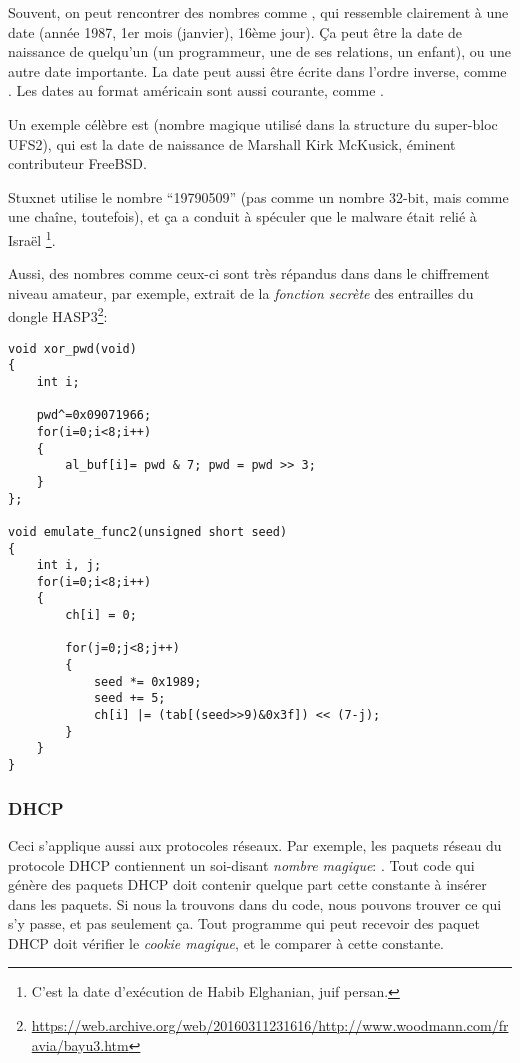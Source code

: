 
Souvent, on peut rencontrer des nombres comme , qui ressemble clairement
à une date (année 1987, 1er mois (janvier), 16ème jour).
Ça peut être la date de naissance de quelqu'un (un programmeur, une de ses relations,
un enfant), ou une autre date importante.
La date peut aussi être écrite dans l'ordre inverse, comme .
Les dates au format américain sont aussi courante, comme .

Un exemple célèbre est  (nombre magique utilisé dans la structure
du super-bloc UFS2), qui est la date de naissance de Marshall Kirk McKusick, éminent
contributeur FreeBSD.

Stuxnet utilise le nombre ``19790509'' (pas comme un nombre 32-bit, mais comme une
chaîne, toutefois), et ça a conduit à spéculer que le malware était relié à Israël%
\footnote{C'est la date d'exécution de Habib Elghanian, juif persan.}.

Aussi, des nombres comme ceux-ci sont très répandus dans dans le chiffrement niveau
amateur, par exemple, extrait de la \emph{fonction secrète} des entrailles du dongle
HASP3\footnote{\url{https://web.archive.org/web/20160311231616/http://www.woodmann.com/fravia/bayu3.htm}}:

\begin{lstlisting}[style=customc]
void xor_pwd(void)
{
	int i;

	pwd^=0x09071966;
	for(i=0;i<8;i++)
	{
		al_buf[i]= pwd & 7; pwd = pwd >> 3;
	}
};

void emulate_func2(unsigned short seed)
{
	int i, j;
	for(i=0;i<8;i++)
	{
		ch[i] = 0;

		for(j=0;j<8;j++)
		{
			seed *= 0x1989;
			seed += 5;
			ch[i] |= (tab[(seed>>9)&0x3f]) << (7-j);
		}
	}
}
\end{lstlisting}

\subsubsection{DHCP}

Ceci s'applique aussi aux protocoles réseaux.
Par exemple, les paquets réseau du protocole DHCP contiennent un soi-disant \emph{nombre
magique}: .
Tout code qui génère des paquets DHCP doit contenir quelque part cette constante
à insérer dans les paquets.
Si nous la trouvons dans du code, nous pouvons trouver ce qui s'y passe, et pas seulement ça.
Tout programme qui peut recevoir des paquet DHCP doit vérifier le \emph{cookie magique},
et le comparer à cette constante.

